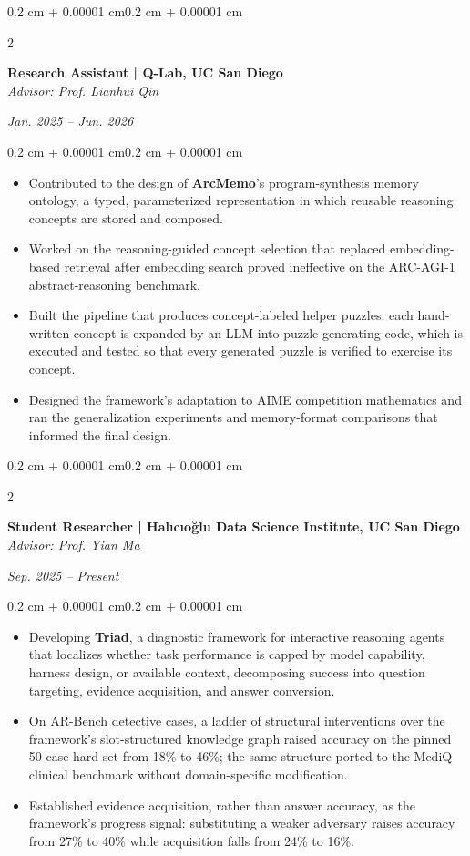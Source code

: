 \documentclass[10pt, letterpaper]{article}
\newenvironment{highlights}{
    \begin{itemize}[
        topsep=0.10 cm,
        parsep=0.10 cm,
        partopsep=0pt,
        itemsep=0pt,
        leftmargin=0.4 cm + 10pt
    ]
}{\end{itemize}}
\newenvironment{onecolentry}{
    \begin{adjustwidth}{0.2 cm + 0.00001 cm}{0.2 cm + 0.00001 cm}
}{\end{adjustwidth}}
\newenvironment{twocolentry}[2][]{
    \onecolentry
    \def\secondColumn{#2}
    \setcolumnwidth{\fill, 4.5 cm}
    \begin{paracol}{2}
}{
    \switchcolumn \raggedleft \secondColumn
    \end{paracol}
    \endonecolentry
}
\begin{document}
    \begin{twocolentry}{\textit{Jan. 2025 -- Jun. 2026}}
        \textbf{Research Assistant | Q-Lab, UC San Diego}\\
        \textit{Advisor: Prof. Lianhui Qin}
    \end{twocolentry}
    \vspace{0.10 cm}
    \begin{onecolentry}
        \begin{highlights}
            \item Contributed to the design of \textbf{ArcMemo}'s program-synthesis memory ontology, a typed, parameterized representation in which reusable reasoning concepts are stored and composed.
            \item Worked on the reasoning-guided concept selection that replaced embedding-based retrieval after embedding search proved ineffective on the ARC-AGI-1 abstract-reasoning benchmark.
            \item Built the pipeline that produces concept-labeled helper puzzles: each hand-written concept is expanded by an LLM into puzzle-generating code, which is executed and tested so that every generated puzzle is verified to exercise its concept.
            \item Designed the framework's adaptation to AIME competition mathematics and ran the generalization experiments and memory-format comparisons that informed the final design.
        \end{highlights}
    \end{onecolentry}

    \vspace{0.20 cm}

    \begin{twocolentry}{\textit{Sep. 2025 -- Present}}
        \textbf{Student Researcher | Halıcıo\u{g}lu Data Science Institute, UC San Diego}\\
        \textit{Advisor: Prof. Yian Ma}
    \end{twocolentry}
    \vspace{0.10 cm}
    \begin{onecolentry}
        \begin{highlights}
            \item Developing \textbf{Triad}, a diagnostic framework for interactive reasoning agents that localizes whether task performance is capped by model capability, harness design, or available context, decomposing success into question targeting, evidence acquisition, and answer conversion.
            \item On AR-Bench detective cases, a ladder of structural interventions over the framework's slot-structured knowledge graph raised accuracy on the pinned 50-case hard set from 18\% to 46\%; the same structure ported to the MediQ clinical benchmark without domain-specific modification.
            \item Established evidence acquisition, rather than answer accuracy, as the framework's progress signal: substituting a weaker adversary raises accuracy from 27\% to 40\% while acquisition falls from 24\% to 16\%.
        \end{highlights}
    \end{onecolentry}
\end{document}

